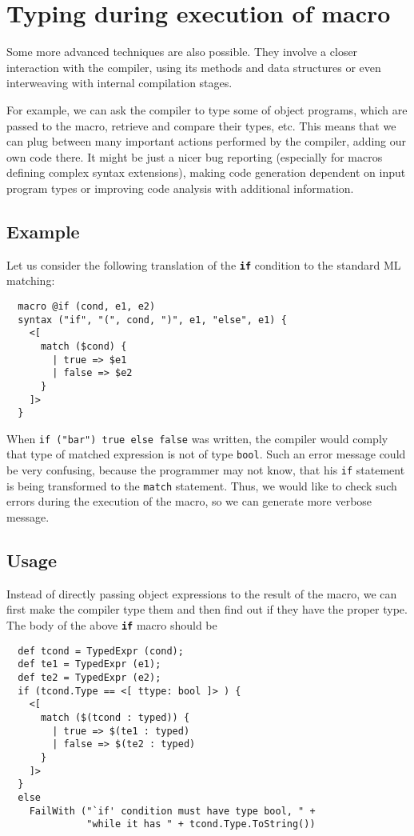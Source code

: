 \documentclass{llncs}
\newcommand{\kw}[1]{{\tt \bf #1}}
\begin{document}
\section{Typing during execution of macro}
Some more advanced techniques are also possible. They involve a closer
interaction with the compiler, using its methods and data structures
or even interweaving with internal compilation stages.

For example, we can ask the compiler to type some of object programs,
which are passed to the macro, retrieve and compare their types, etc.
This means that we can plug between many important actions performed by 
the compiler, adding our own code there. It might be just a nicer 
bug reporting (especially for macros defining complex syntax extensions), 
making code generation dependent on input program types or improving
code analysis with additional information.

\subsection{Example}
Let us consider the following translation of the \kw{if} condition to the standard
ML matching:

\begin{verbatim}
  macro @if (cond, e1, e2)
  syntax ("if", "(", cond, ")", e1, "else", e1) {
    <[ 
      match ($cond) {
        | true => $e1
        | false => $e2
      }       
    ]>
  }
\end{verbatim} %

When \verb,if ("bar") true else false, was written, the compiler would comply
that type of matched expression is not of type \verb,bool,. Such an error 
message could be very confusing, because the programmer may not know, that his 
\verb,if, statement is being transformed to the \verb,match, statement. Thus, 
we would like to check such errors during the execution of the macro, so we can
generate more verbose message.

\subsection{Usage}
Instead of directly passing object expressions to the result of the macro, we
can first make the compiler type them and then find out if they have the proper
type. The body of the above \kw{if} macro should be

\begin{verbatim}
  def tcond = TypedExpr (cond);
  def te1 = TypedExpr (e1);
  def te2 = TypedExpr (e2);
  if (tcond.Type == <[ ttype: bool ]> ) {
    <[ 
      match ($(tcond : typed)) { 
        | true => $(te1 : typed) 
        | false => $(te2 : typed) 
      } 
    ]>
  }
  else
    FailWith ("`if' condition must have type bool, " +
              "while it has " + tcond.Type.ToString())
\end{verbatim}
\end{document}
